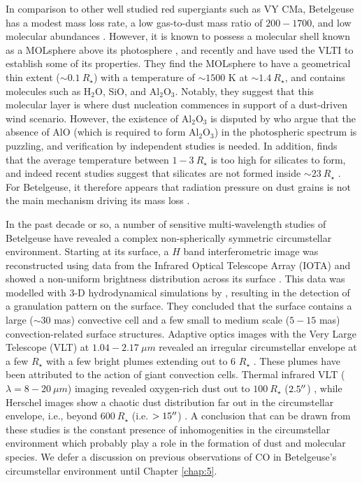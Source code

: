 In comparison to other well studied red supergiants such as VY CMa, Betelgeuse has a modest mass loss rate, a low gas-to-dust mass ratio of $200-1700$, and low molecular abundances \citep{harper_2001}. However, it is known to possess a molecular shell known as a MOLsphere above its photosphere \citep{tsuji_2000}, and recently \cite{verhoelst_2006} and \cite{perrin_2007} have used the VLTI to establish some of its properties. They find the MOLsphere to have a geometrical thin extent ($\sim 0.1 \ R_{\star}$) with a temperature of $\sim 1500$ K at $\sim 1.4 \ R_{\star}$, and contains molecules such as H$_{2}$O, SiO, and Al$_{2}$O$_{3}$. Notably, they suggest that this molecular layer is where dust nucleation commences in support of a dust-driven wind scenario. However, the existence of Al$_{2}$O$_{3}$ is disputed by \cite{kaminski_2013} who argue that the absence of AlO (which is required to form Al$_{2}$O$_{3}$) in the photospheric spectrum is puzzling, and verification by independent studies is needed. In addition, \cite{woitke_2006} finds that the average temperature between $1-3 \ R_{\star}$ is too high for silicates to form, and indeed recent studies suggest that silicates are not formed inside $\sim 23 \ R_{\star}$ \citep{skinner_1997,tatebe_2007}. For Betelgeuse, it therefore appears that radiation pressure on dust grains is not the main mechanism driving its mass loss \citep{harper_2010}.

In the past decade or so, a number of sensitive multi-wavelength studies of Betelgeuse have revealed a complex non-spherically symmetric circumstellar environment. Starting at its surface, a $H$ band interferometric image was reconstructed using data from the Infrared Optical Telescope Array (IOTA) and showed a non-uniform brightness distribution across its surface \citep{haubois_2009}. This data was modelled with 3-D hydrodynamical simulations by \cite{chiavassa_2010}, resulting in the detection of a granulation pattern on the surface. They concluded that  the surface contains a large ($\sim 30$ mas) convective cell and a few small to medium scale ($5-15$ mas) convection-related surface structures. Adaptive optics images with the Very Large Telescope (VLT) at $1.04 -2.17 \ \mu m$ revealed an irregular circumstellar envelope at a few $R_{\star}$ with a few bright plumes extending out to 6 $R_{\star}$ \citep{kervella_2009}. These plumes have been attributed to the action of giant convection cells. Thermal infrared VLT ($\lambda=8-20 \ \mu m$) imaging revealed oxygen-rich dust out to $100 \ R_{\star}$ ($2.5^{\prime\prime}$) \citep{kervella_2011}, while Herschel images show a chaotic dust distribution far out in the circumstellar envelope, i.e., beyond $600 \ R_{\star}$ (i.e. $> 15^{\prime\prime}$) \citep{decin_2012}. A conclusion that can be drawn from these studies is the constant presence of inhomogenities in the circumstellar environment which probably play a role in the formation of dust and molecular species. We defer a discussion on previous observations of CO in Betelgeuse's circumstellar environment until Chapter \ref{chap:5}.

